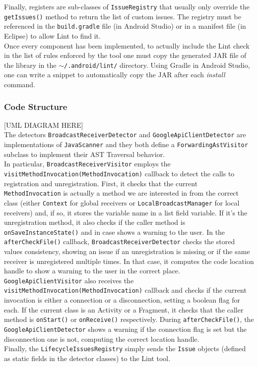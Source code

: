\documentclass[11pt,a4paper,notitlepage]{article}
\begin{document}
Finally, registers are sub-classes of \texttt{IssueRegistry} that usually only override the \texttt{getIssues()} method to return the list of custom issues. The registry must be referenced in the \texttt{build.gradle} file (in Android Studio) or in a manifest file (in Eclipse) to allow Lint to find it.\bigskip \\
Once every component has been implemented, to actually include the Lint check in the list of rules enforced by the tool one must copy the generated JAR file of the library in the \texttt{$\sim$/.android/lint/} directory. Using Gradle in Android Studio, one can write a snippet to automatically copy the JAR after each \textit{install} command.

\subsubsection{Code Structure}
[UML DIAGRAM HERE]\medskip \\
The detectors \texttt{BroadcastReceiverDetector} and \texttt{GoogleApiClientDetector} are implementations of \texttt{JavaScanner} and they both define a \texttt{ForwardingAstVisitor} subclass to implement their AST Traversal behavior.\medskip \\
In particular, \texttt{BroadcastReceiverVisitor} employs the \texttt{visitMethodInvocation(MethodInvocation)} callback to detect the calls to registration and unregistration. First, it checks that the current \texttt{MethodInvocation} is actually a method we are interested in from the correct class (either \texttt{Context} for global receivers or \texttt{LocalBroadcastManager} for local receivers) and, if so, it stores the variable name in a list field variable. If it's the unregistration method, it also checks if the caller method is \texttt{onSaveInstanceState()} and in case shows a warning to the user. In the \texttt{afterCheckFile()} callback,  \texttt{BroadcastReceiverDetector} checks the stored values consistency, showing an issue if an unregistration is missing or if the same receiver is unregistered multiple times. In that case, it computes the code location handle to show a warning to the user in the correct place.\medskip \\
\texttt{GoogleApiClientVisitor} also receives the \texttt{visitMethodInvocation(MethodInvocation)} callback and checks if the current invocation is either a connection or a disconnection, setting a boolean flag for each. If the current class is an Activity or a Fragment, it checks that the caller method is \texttt{onStart()} or \texttt{onReceive()} respectively. During \texttt{afterCheckFile()}, the \texttt{GoogleApiClientDetector} shows a warning if the connection flag is set but the disconnection one is not, computing the correct location handle.\bigskip \\
Finally, the \texttt{LifecycleIssuesRegistry} simply sends the \texttt{Issue} objects (defined as static fields in the detector classes) to the Lint tool.
\end{document}
